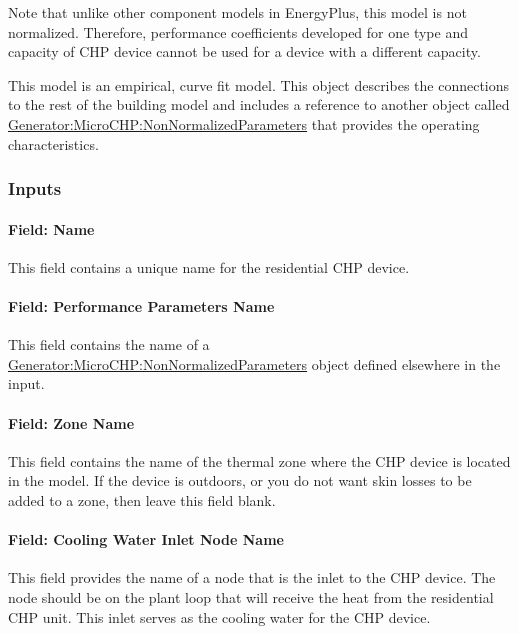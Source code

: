 Note that unlike other component models in EnergyPlus, this model is not normalized. Therefore, performance coefficients developed for one type and capacity of CHP device cannot be used for a device with a different capacity.

This model is an empirical, curve fit model. This object describes the connections to the rest of the building model and includes a reference to another object called \hyperref[generatormicrochpnonnormalizedparameters]{Generator:MicroCHP:NonNormalizedParameters} that provides the operating characteristics.

\subsubsection{Inputs}\label{inputs-10-003}

\paragraph{Field: Name}\label{field-name-11-003}

This field contains a unique name for the residential CHP device.

\paragraph{Field: Performance Parameters Name}\label{field-performance-parameters-name}

This field contains the name of a \hyperref[generatormicrochpnonnormalizedparameters]{Generator:MicroCHP:NonNormalizedParameters} object defined elsewhere in the input.

\paragraph{Field: Zone Name}\label{field-zone-name-7-000}

This field contains the name of the thermal zone where the CHP device is located in the model. If the device is outdoors, or you do not want skin losses to be added to a zone, then leave this field blank.

\paragraph{Field: Cooling Water Inlet Node Name}\label{field-cooling-water-inlet-node-name}

This field provides the name of a node that is the inlet to the CHP device. The node should be on the plant loop that will receive the heat from the residential CHP unit. This inlet serves as the cooling water for the CHP device.


